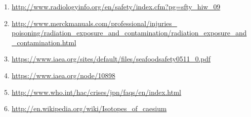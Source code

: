 
\begin{enumerate}
	\item \href{http://www.radiologyinfo.org/en/safety/index.cfm?pg=sfty_hiw_09}{http://www.radiologyinfo.org/en/safety/index.cfm?pg=sfty\_hiw\_09}
	\item \href{http://www.merckmanuals.com/professional/injuries_poisoning/radiation_exposure_and_contamination/radiation_exposure_and_contamination.html}{http://www.merckmanuals.com/professional/injuries\_\\poisoning/radiation\_exposure\_and\_contamination/radiation\_exposure\_and\_contamination.html}
	\item \href{https://www.iaea.org/sites/default/files/seafoodsafety0511_0.pdf}{https://www.iaea.org/sites/default/files/seafoodsafety0511\_0.pdf}
	\item \href{https://www.iaea.org/node/10898}{https://www.iaea.org/node/10898}
	\item \href{http://www.who.int/hac/crises/jpn/faqs/en/index.html}{http://www.who.int/hac/crises/jpn/faqs/en/index.html}
	\item \href{http://en.wikipedia.org/wiki/Isotopes_of_caesium}{http://en.wikipedia.org/wiki/Isotopes\_of\_caesium}
\end{enumerate}

